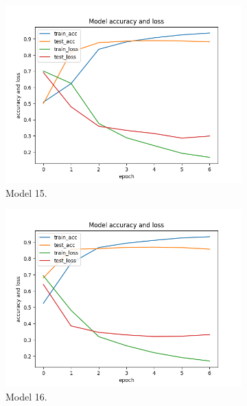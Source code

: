 \documentclass[11pt]{article}
\begin{document}
\begin{figure}[h!]
\begin{subfigure}{0.32\textwidth}
         \includegraphics[width=\textwidth]{model15.png}
         \caption{Model 15.}
         \label{fig:model15}
\end{subfigure}
\hfill
\begin{subfigure}{0.32\textwidth}
         \centering
         \includegraphics[width=\textwidth]{model16.png}
         \caption{Model 16.}
         \label{fig:model16}
\end{subfigure}
\hfill
\begin{subfigure}{0.32\textwidth}
         \centering

\end{subfigure}
\end{figure}
\end{document}

